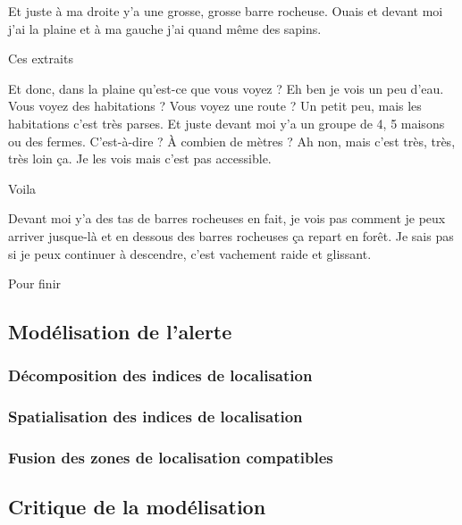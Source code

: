 \begin{dialogue}
  \Req {} Et juste à ma droite y’a une grosse, grosse
  barre rocheuse.  Ouais et devant moi j’ai la plaine
  et  à ma gauche j’ai quand même des sapins.
\end{dialogue}
% 
Ces extraits


\begin{dialogue}
  \Sec {} Et donc, dans la plaine qu’est-ce que vous
  voyez ?
  \Req {} Eh ben je vois un peu d’eau.
  \Sec {} Vous voyez des habitations ? Vous voyez une
  route ?
  \Req {} Un petit peu, mais les habitations c’est très
  parses.  Et juste devant moi y’a un groupe de 4, 5
  maisons ou des fermes.
  \Sec {} C’est-à-dire ? À combien de mètres ?
  \Req {} Ah non, mais c’est très, très, très loin
  ça. Je les vois mais c’est pas accessible.
\end{dialogue}
% 
Voila


\begin{dialogue}
  \Req {} Devant moi y’a des tas de barres rocheuses en
  fait, je vois pas comment je peux arriver jusque-là et
   en dessous des barres rocheuses ça repart en
  forêt.  Je sais pas si je peux continuer à
  descendre, c’est vachement raide et glissant.
\end{dialogue}
% 
Pour finir

\subsection{Modélisation de l'alerte}
\label{subsec:9-3-2}

\subsubsection{Décomposition des indices de localisation}
\label{subsec:9-3-2-2}

\subsubsection{Spatialisation des indices de localisation}
\label{subsec:9-3-2-3}

\subsubsection{Fusion des zones de localisation compatibles}
\label{subsec:9-3-2-4}

\subsection{Critique de la modélisation}
\label{subsec:9-3-3}



